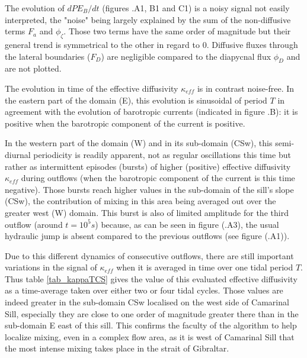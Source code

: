 The evolution of $dPE_B/dt$ (figures .A1, B1 and C1) is a noisy signal not easily interpreted, the "noise" being largely explained by the sum of the non-diffusive terms $F_a$ and $\phi_{\zeta}$. Those two terms have the same order of magnitude but their general trend is symmetrical to the other in regard to 0. Diffusive fluxes through the lateral boundaries ($F_D$) are negligible compared to the diapycnal flux $\phi_D$ and are not plotted.

The evolution in time of the effective diffusivity $\kappa_{eff}$ is in contrast noise-free. In the eastern part of the domain (E), this evolution is sinusoidal of period $T$ in agreement with the evolution of barotropic currents (indicated in figure .B): it is positive when the barotropic component of the current is positive.

In the western part of the domain (W) and in its sub-domain (CSw), this semi-diurnal periodicity is readily apparent, not as regular oscillations this time but rather as intermittent episodes (bursts) of higher (positive) effective diffusivity $\kappa_{eff}$ during outflows (when the barotropic component of the current is this time negative). Those bursts reach higher values in the sub-domain of the sill's slope (CSw), the contribution of mixing in this area being averaged out over the greater west (W) domain. This burst is also of limited amplitude for the third outflow (around $t=10^5s$) because, as can be seen in figure (.A3), the usual hydraulic jump is absent compared to the previous outflows (see figure (.A1)).

Due to this different dynamics of consecutive outflows, there are still important variations in the signal of $\kappa_{eff}$ when it is averaged in time over one tidal period $T$. Thus table \ref{tab_kappaTCS} gives the value of this evaluated effective diffusivity as a time-average taken over either two or four tidal cycles. Those values are indeed greater in the sub-domain CSw localised on the west side of Camarinal Sill, especially they are close to one order of magnitude greater there than in the sub-domain E east of this sill. This confirms the faculty of the algorithm to help localize mixing, even in a complex flow area, as it is west of Camarinal Sill that the most intense mixing takes place in the strait of Gibraltar.%

